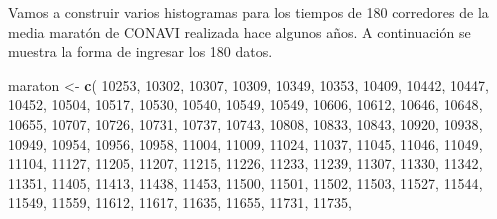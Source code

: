 \documentclass[10pt,]{krantz}
\makeatletter
\newenvironment{Shaded}{\begin{snugshade}}{\end{snugshade}}
\newcommand{\KeywordTok}[1]{\textcolor[rgb]{0.13,0.29,0.53}{\textbf{{#1}}}}
\newcommand{\DecValTok}[1]{\textcolor[rgb]{0.00,0.00,0.81}{{#1}}}
\newcommand{\StringTok}[1]{\textcolor[rgb]{0.31,0.60,0.02}{{#1}}}
\newcommand{\NormalTok}[1]{{#1}}
\newenvironment{kframe}{%
\medskip{}
\setlength{\fboxsep}{.8em}
 \def\at@end@of@kframe{}%
 \ifinner\ifhmode%
  \def\at@end@of@kframe{\end{minipage}}%
  \begin{minipage}{\columnwidth}%
 \fi\fi%
 \def\FrameCommand##1{\hskip\@totalleftmargin \hskip-\fboxsep
 \colorbox{shadecolor}{##1}\hskip-\fboxsep
     \hskip-\linewidth \hskip-\@totalleftmargin \hskip\columnwidth}%
 \MakeFramed {\advance\hsize-\width
   \@totalleftmargin\z@ \linewidth\hsize
   \@setminipage}}%
 {\par\unskip\endMakeFramed%
 \at@end@of@kframe}
\renewenvironment{Shaded}{\begin{kframe}}{\end{kframe}}
\makeatother
\begin{document}
Vamos a construir varios histogramas para los tiempos de 180 corredores
de la media maratón de CONAVI realizada hace algunos años. A
continuación se muestra la forma de ingresar los 180 datos.

\begin{Shaded}
\begin{Highlighting}[]
\NormalTok{maraton <-}\StringTok{ }\KeywordTok{c}\NormalTok{(}
\DecValTok{10253}\NormalTok{, }\DecValTok{10302}\NormalTok{, }\DecValTok{10307}\NormalTok{, }\DecValTok{10309}\NormalTok{, }\DecValTok{10349}\NormalTok{, }\DecValTok{10353}\NormalTok{, }\DecValTok{10409}\NormalTok{, }\DecValTok{10442}\NormalTok{, }\DecValTok{10447}\NormalTok{, }
\DecValTok{10452}\NormalTok{, }\DecValTok{10504}\NormalTok{, }\DecValTok{10517}\NormalTok{, }\DecValTok{10530}\NormalTok{, }\DecValTok{10540}\NormalTok{, }\DecValTok{10549}\NormalTok{, }\DecValTok{10549}\NormalTok{, }\DecValTok{10606}\NormalTok{, }\DecValTok{10612}\NormalTok{, }
\DecValTok{10646}\NormalTok{, }\DecValTok{10648}\NormalTok{, }\DecValTok{10655}\NormalTok{, }\DecValTok{10707}\NormalTok{, }\DecValTok{10726}\NormalTok{, }\DecValTok{10731}\NormalTok{, }\DecValTok{10737}\NormalTok{, }\DecValTok{10743}\NormalTok{, }\DecValTok{10808}\NormalTok{, }
\DecValTok{10833}\NormalTok{, }\DecValTok{10843}\NormalTok{, }\DecValTok{10920}\NormalTok{, }\DecValTok{10938}\NormalTok{, }\DecValTok{10949}\NormalTok{, }\DecValTok{10954}\NormalTok{, }\DecValTok{10956}\NormalTok{, }\DecValTok{10958}\NormalTok{, }\DecValTok{11004}\NormalTok{, }
\DecValTok{11009}\NormalTok{, }\DecValTok{11024}\NormalTok{, }\DecValTok{11037}\NormalTok{, }\DecValTok{11045}\NormalTok{, }\DecValTok{11046}\NormalTok{, }\DecValTok{11049}\NormalTok{, }\DecValTok{11104}\NormalTok{, }\DecValTok{11127}\NormalTok{, }\DecValTok{11205}\NormalTok{, }
\DecValTok{11207}\NormalTok{, }\DecValTok{11215}\NormalTok{, }\DecValTok{11226}\NormalTok{, }\DecValTok{11233}\NormalTok{, }\DecValTok{11239}\NormalTok{, }\DecValTok{11307}\NormalTok{, }\DecValTok{11330}\NormalTok{, }\DecValTok{11342}\NormalTok{, }\DecValTok{11351}\NormalTok{, }
\DecValTok{11405}\NormalTok{, }\DecValTok{11413}\NormalTok{, }\DecValTok{11438}\NormalTok{, }\DecValTok{11453}\NormalTok{, }\DecValTok{11500}\NormalTok{, }\DecValTok{11501}\NormalTok{, }\DecValTok{11502}\NormalTok{, }\DecValTok{11503}\NormalTok{, }\DecValTok{11527}\NormalTok{, }
\DecValTok{11544}\NormalTok{, }\DecValTok{11549}\NormalTok{, }\DecValTok{11559}\NormalTok{, }\DecValTok{11612}\NormalTok{, }\DecValTok{11617}\NormalTok{, }\DecValTok{11635}\NormalTok{, }\DecValTok{11655}\NormalTok{, }\DecValTok{11731}\NormalTok{, }\DecValTok{11735}\NormalTok{,}

\end{Highlighting}
\end{Shaded}
\end{document}
